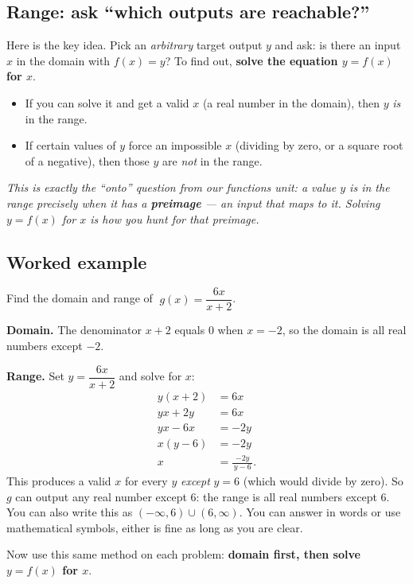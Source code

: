 \documentclass[12pt]{article}
\begin{document}
\subsection*{Range: ask ``which outputs are reachable?''}
Here is the key idea. Pick an \emph{arbitrary} target output $y$ and ask: is there an input $x$ in the domain with
$f(x) = y$? To find out, \textbf{solve the equation $y = f(x)$ for $x$}.
\begin{itemize}
  \item If you can solve it and get a valid $x$ (a real number in the domain), then $y$ \emph{is} in the range.
  \item If certain values of $y$ force an impossible $x$ (dividing by zero, or a square root of a negative), then
        those $y$ are \emph{not} in the range.
\end{itemize}

\textit{This is exactly the ``onto'' question from our functions unit: a value $y$ is in the range precisely when
it has a \textbf{preimage} --- an input that maps to it. Solving $y = f(x)$ for $x$ is how you hunt for that
preimage.}

\subsection*{Worked example}
Find the domain and range of $\;g(x) = \dfrac{6x}{x+2}$.

\textbf{Domain.} The denominator $x+2$ equals $0$ when $x = -2$, so the domain is all real numbers except $-2$.

\textbf{Range.} Set $y = \dfrac{6x}{x+2}$ and solve for $x$:
\begin{align*}
  y(x+2) &= 6x \\
  yx + 2y &= 6x \\
  yx - 6x &= -2y \\
  x(y-6) &= -2y \\
  x &= \frac{-2y}{\,y-6\,}.
\end{align*}
This produces a valid $x$ for every $y$ \emph{except} $y = 6$ (which would divide by zero). So $g$ can output any
real number except $6$: the range is all real numbers except $6$. You can also write this as $(-\infty,6) \cup (6,\infty)$. You can answer in words or use mathematical symbols, either is fine as long as you are clear.

\medskip
Now use this same method on each problem: \textbf{domain first, then solve $y = f(x)$ for $x$}.

\newpage
\end{document}
